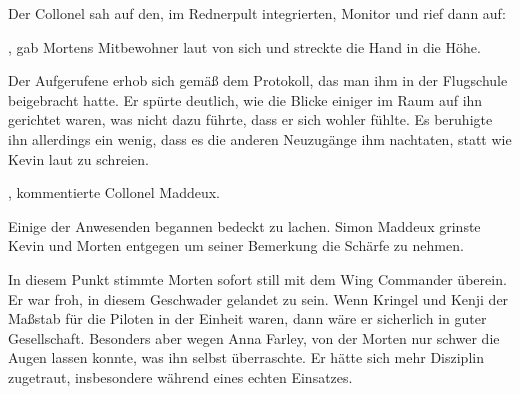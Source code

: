 \par

Der Collonel sah auf den, im Rednerpult integrierten, Monitor und rief dann auf: 

\par

, gab Mortens Mitbewohner laut von sich und streckte die Hand in die Höhe.

\par


\par

Der Aufgerufene erhob sich gemäß dem Protokoll, das man ihm in der Flugschule beigebracht hatte. Er spürte deutlich, wie die Blicke einiger im Raum auf ihn gerichtet waren, was nicht dazu führte, dass er sich wohler fühlte. Es beruhigte ihn allerdings ein wenig, dass es die anderen Neuzugänge ihm nachtaten, statt wie Kevin laut zu schreien.

\par

, kommentierte Collonel Maddeux. 

\par

Einige der Anwesenden begannen bedeckt zu lachen. Simon Maddeux grinste Kevin und Morten entgegen um seiner Bemerkung die Schärfe zu nehmen.

\par


\par

In diesem Punkt stimmte Morten sofort still mit dem Wing Commander überein. Er war froh, in diesem Geschwader gelandet zu sein. Wenn Kringel und Kenji der Maßstab für die Piloten in der Einheit waren, dann wäre er sicherlich in guter Gesellschaft. Besonders aber wegen Anna Farley, von der Morten nur schwer die Augen lassen konnte, was ihn selbst überraschte. Er hätte sich mehr Disziplin zugetraut, insbesondere während eines echten Einsatzes.

